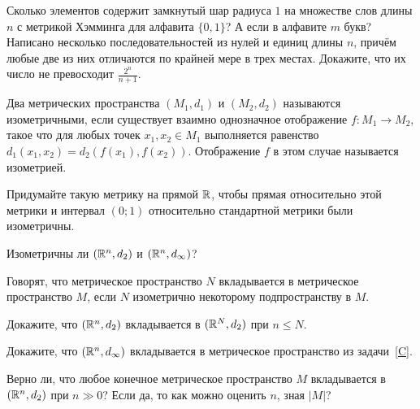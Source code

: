 \documentclass[a4paper,12pt]{article}
\begin{document}
Сколько элементов содержит замкнутый шар радиуса $1$ на множестве слов длины $n$ с метрикой Хэмминга для алфавита $\{0,1\}$? А если в алфавите $m$ букв?
Написано несколько последовательностей из нулей и единиц длины $n$, причём любые две из них отличаются по крайней мере в трех местах. Докажите, что их число не превосходит $\frac{2^n}{n+1}$.

Два метрических пространства $(M_1, d_1)$ и $(M_2, d_2)$ называются  изометричными, если существует взаимно однозначное отображение $f\colon M_1 \to M_2$, такое что для любых точек $x_1, x_2 \in M_1$ выполняется равенство $d_1(x_1,x_2)=d_2(f(x_1),f(x_2))$. Отображение $f$ в этом случае называется  изометрией.

Придумайте такую метрику на прямой $\mathbb{R}$, чтобы прямая относительно этой метрики и интервал $(0;1)$ относительно стандартной метрики были изометричны.

Изометричны ли $(\mathbb{R}^n, d_2)$ и $(\mathbb{R}^n, d_\infty)$?

Говорят, что метрическое пространство $N$  вкладывается в метрическое пространство $M$, если $N$ изометрично некоторому подпространству в $M$.

Докажите, что $(\mathbb{R}^n, d_2)$ вкладывается в $(\mathbb{R}^N, d_2)$ при $n \le N$.

Докажите, что $(\mathbb{R}^n, d_\infty)$ вкладывается в метрическое пространство из задачи~\ref{C}.

Верно ли, что любое конечное метрическое пространство $M$ вкладывается в $(\mathbb{R}^n, d_2)$ при $n \gg 0$? Если да, то как можно оценить $n$, зная $|M|$?



{}
\end{document}
